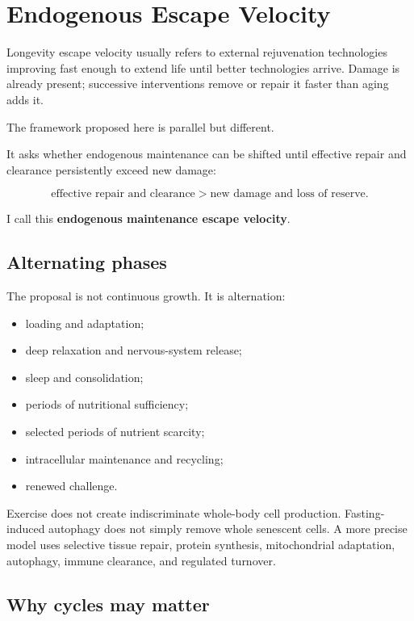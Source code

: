 \chapter{Endogenous Escape Velocity}

Longevity escape velocity usually refers to external rejuvenation technologies improving fast enough to extend life until better technologies arrive. Damage is already present; successive interventions remove or repair it faster than aging adds it.

The framework proposed here is parallel but different.

It asks whether endogenous maintenance can be shifted until effective repair and clearance persistently exceed new damage:

\[
\text{effective repair and clearance} > \text{new damage and loss of reserve}.
\]

I call this \textbf{endogenous maintenance escape velocity}.

\section{Alternating phases}

The proposal is not continuous growth. It is alternation:

\begin{itemize}
\tightlist
\item
  loading and adaptation;
\item
  deep relaxation and nervous-system release;
\item
  sleep and consolidation;
\item
  periods of nutritional sufficiency;
\item
  selected periods of nutrient scarcity;
\item
  intracellular maintenance and recycling;
\item
  renewed challenge.
\end{itemize}

Exercise does not create indiscriminate whole-body cell production. Fasting-induced autophagy does not simply remove whole senescent cells. A more precise model uses selective tissue repair, protein synthesis, mitochondrial adaptation, autophagy, immune clearance, and regulated turnover.

\section{Why cycles may matter}


